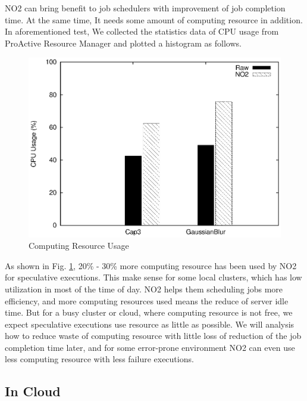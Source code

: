 NO2 can bring benefit to job schedulers with improvement of job completion time. At the same time, It needs some amount of computing resource in addition. In aforementioned test, We collected the statistics data of CPU usage from ProActive Resource Manager and plotted a histogram as follows.

\begin{figure}
\centering
\includegraphics[width=0.9\columnwidth]{figures/resource_usage.eps}
\caption{Computing Resource Usage}
\label{figure:resourceusage}
\end{figure}

As shown in Fig.  \ref{figure:resourceusage}, 20\% - 30\% more computing resource has been used by NO2 for speculative executions. This make sense for some local clusters, which has low utilization in most of the time of day. NO2 helps them scheduling jobs more efficiency, and more computing resources used means the reduce of server idle time. But for a busy cluster or cloud, where computing resource is not free, we expect speculative executions use resource as little as possible. We will analysis how to reduce waste of computing resource with little loss of reduction of the job completion time later, and for some error-prone environment NO2 can even use less computing resource with less failure executions.

\subsection{In Cloud}

